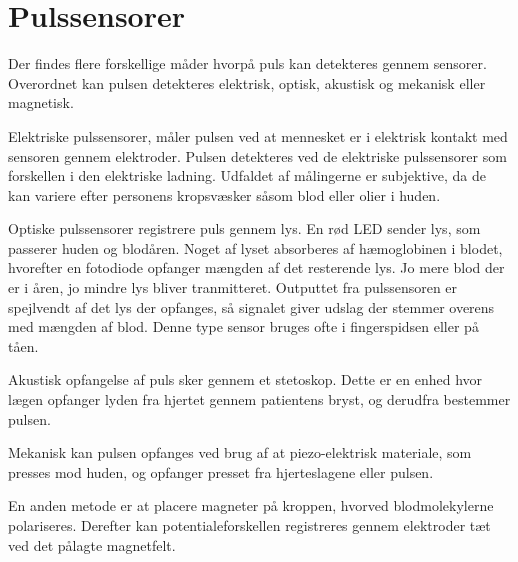 \section{Pulssensorer}
Der findes flere forskellige måder hvorpå puls kan detekteres gennem sensorer. Overordnet kan pulsen detekteres elektrisk, optisk, akustisk og mekanisk eller magnetisk. 

Elektriske pulssensorer, måler pulsen ved at mennesket er i elektrisk kontakt med sensoren gennem elektroder. Pulsen detekteres ved de elektriske pulssensorer som forskellen i den elektriske ladning. Udfaldet af målingerne er subjektive, da de kan variere efter personens kropsvæsker såsom blod eller olier i huden. 

Optiske pulssensorer registrere puls gennem lys. En rød LED sender lys, som passerer huden og blodåren. Noget af lyset absorberes af hæmoglobinen i blodet, hvorefter en fotodiode opfanger mængden af det resterende lys. Jo mere blod der er i åren, jo mindre lys bliver tranmitteret. Outputtet fra pulssensoren er spejlvendt af det lys der opfanges, så signalet giver udslag der stemmer overens med mængden af blod. Denne type sensor bruges ofte i fingerspidsen eller på tåen. 

Akustisk opfangelse af puls sker gennem et stetoskop. Dette er en enhed hvor lægen opfanger lyden fra hjertet gennem patientens bryst, og derudfra bestemmer pulsen. 

Mekanisk kan pulsen opfanges ved brug af at piezo-elektrisk materiale, som presses mod huden, og opfanger presset fra hjerteslagene eller pulsen. 

En anden metode er at placere magneter på kroppen, hvorved blodmolekylerne polariseres. Derefter kan potentialeforskellen registreres gennem elektroder tæt ved det pålagte magnetfelt. 